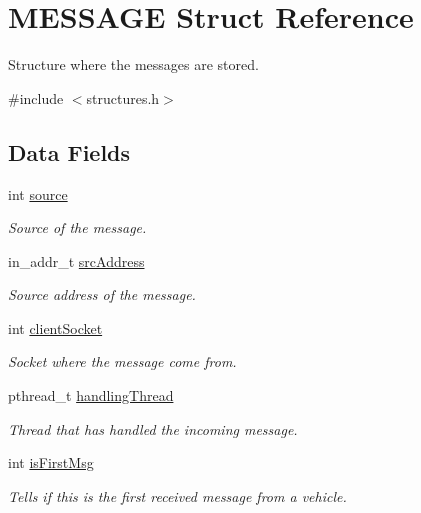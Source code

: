 \hypertarget{struct_m_e_s_s_a_g_e}{}\section{M\+E\+S\+S\+A\+GE Struct Reference}
\label{struct_m_e_s_s_a_g_e}


Structure where the messages are stored.  




{\ttfamily \#include $<$structures.\+h$>$}

\subsection*{Data Fields}
\begin{DoxyCompactItemize}
\item 
int \hyperlink{struct_m_e_s_s_a_g_e_a07a87b2e6ed927503e2f95f119c9fc23}{source}
\begin{DoxyCompactList}\small\item\em Source of the message. \end{DoxyCompactList}\item 
in\+\_\+addr\+\_\+t \hyperlink{struct_m_e_s_s_a_g_e_a0f4a69f9560bd7ce0c2cbdb91e4a06f9}{src\+Address}
\begin{DoxyCompactList}\small\item\em Source address of the message. \end{DoxyCompactList}\item 
int \hyperlink{struct_m_e_s_s_a_g_e_adc5475d507e3d713ad405bbeb6eb41e7}{client\+Socket}
\begin{DoxyCompactList}\small\item\em Socket where the message come from. \end{DoxyCompactList}\item 
pthread\+\_\+t \hyperlink{struct_m_e_s_s_a_g_e_a868bf6ba4aea009042e5d6ec5639d433}{handling\+Thread}
\begin{DoxyCompactList}\small\item\em Thread that has handled the incoming message. \end{DoxyCompactList}\item 
int \hyperlink{struct_m_e_s_s_a_g_e_aff6139ee4d5782154b1c0732115ceb3f}{is\+First\+Msg}
\begin{DoxyCompactList}\small\item\em Tells if this is the first received message from a vehicle. \end{DoxyCompactList}\item 

\end{DoxyCompactItemize}
